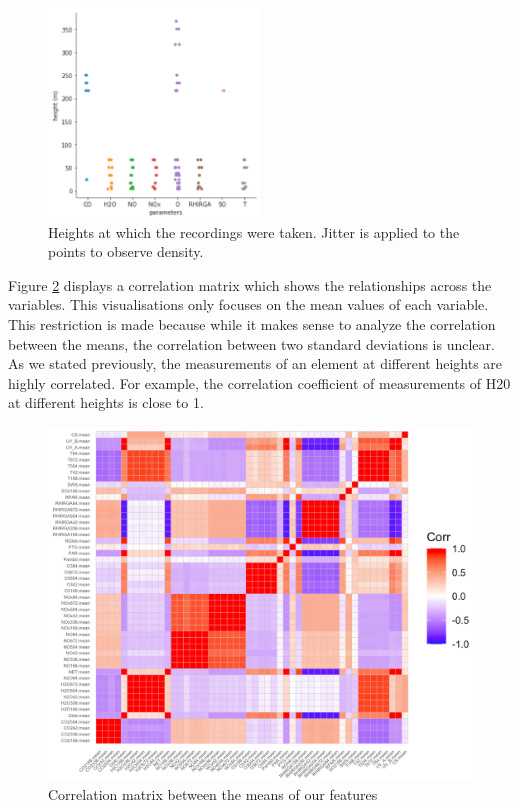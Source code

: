 \begin{figure}
   \centering
   \includegraphics[width=0.5\textwidth]{images/height.png}
   \caption{Heights at which the recordings were taken. Jitter is applied to the points to observe density.}
   \label{fig:height}
\end{figure}

Figure \ref{fig:correlation_matrix} displays a correlation matrix which shows the relationships across the variables. This visualisations only focuses on the mean values of each variable. This restriction is made because while it makes sense to analyze the correlation between the means, the correlation between two standard deviations is unclear. As we stated previously, the measurements of an element at different heights are highly correlated. For example, the correlation coefficient of measurements of H20 at different heights is close to 1.

\begin{figure}[!ht]
   \centering
   \includegraphics[width=\textwidth]{images/correlation_matrix.png}
   \caption{Correlation matrix between the means of our features}
   \label{fig:correlation_matrix}
\end{figure}

